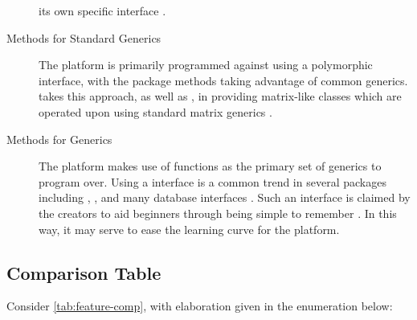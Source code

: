 \begin{description}
    its own specific interface \cite{microsoft20}.
  \item[Methods for Standard Generics]
    The platform is primarily programmed against using a polymorphic
    interface, with the package methods taking advantage of common generics.
     takes this approach, as well as , in providing
    matrix-like classes which are operated upon using standard matrix
    generics \cites{pbdDMATpackage,kane13:bigmemory}.
  \item[Methods for \pkg{dplyr} Generics]
    The platform makes use of  functions as the primary set of generics
    to program over. Using a  interface is a common trend in several \R
    packages including , , and many database interfaces
    \cites{luraschi20,zj20}. Such an interface is claimed by the 
    creators to aid beginners through being simple to remember
    \cite{wickham2019welcome}. In this way, it may serve to ease the
    learning curve for the platform.
\end{description}

\subsection{Comparison Table}\label{subsec:comp-tab}


Consider \cref{tab:feature-comp}, with elaboration given in the enumeration below:

